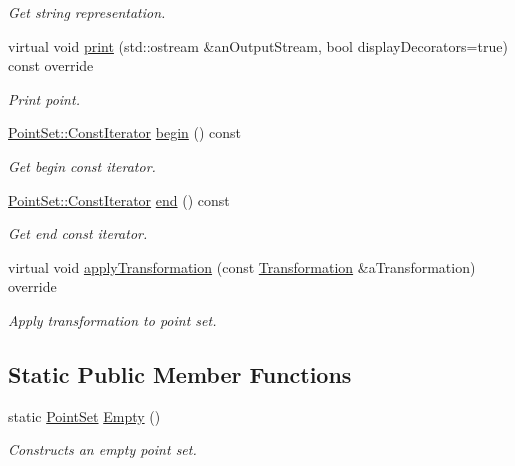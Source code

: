 \begin{DoxyCompactItemize}
\begin{DoxyCompactList}\small\item\em Get string representation. \end{DoxyCompactList}\item 
virtual void \hyperlink{classostk_1_1math_1_1geom_1_1d2_1_1objects_1_1_point_set_aef3263b63b2e9c9667365f58faee9ac7}{print} (std\+::ostream \&an\+Output\+Stream, bool display\+Decorators=true) const override
\begin{DoxyCompactList}\small\item\em Print point. \end{DoxyCompactList}\item 
\hyperlink{classostk_1_1math_1_1geom_1_1d2_1_1objects_1_1_point_set_a6a0613cc686e9247430658eee91036d0}{Point\+Set\+::\+Const\+Iterator} \hyperlink{classostk_1_1math_1_1geom_1_1d2_1_1objects_1_1_point_set_aaa290d13737a148694f97fc557e2069a}{begin} () const
\begin{DoxyCompactList}\small\item\em Get begin const iterator. \end{DoxyCompactList}\item 
\hyperlink{classostk_1_1math_1_1geom_1_1d2_1_1objects_1_1_point_set_a6a0613cc686e9247430658eee91036d0}{Point\+Set\+::\+Const\+Iterator} \hyperlink{classostk_1_1math_1_1geom_1_1d2_1_1objects_1_1_point_set_a49b262b5d0e453fd1870cce164b7288d}{end} () const
\begin{DoxyCompactList}\small\item\em Get end const iterator. \end{DoxyCompactList}\item 
virtual void \hyperlink{classostk_1_1math_1_1geom_1_1d2_1_1objects_1_1_point_set_a8c4140ca8434580a95df773d3aeed5bb}{apply\+Transformation} (const \hyperlink{classostk_1_1math_1_1geom_1_1d2_1_1_transformation}{Transformation} \&a\+Transformation) override
\begin{DoxyCompactList}\small\item\em Apply transformation to point set. \end{DoxyCompactList}\end{DoxyCompactItemize}
\subsection*{Static Public Member Functions}
\begin{DoxyCompactItemize}
\item 
static \hyperlink{classostk_1_1math_1_1geom_1_1d2_1_1objects_1_1_point_set}{Point\+Set} \hyperlink{classostk_1_1math_1_1geom_1_1d2_1_1objects_1_1_point_set_a09f5e125c7b4545a75e4eea6193bf615}{Empty} ()
\begin{DoxyCompactList}\small\item\em Constructs an empty point set. \end{DoxyCompactList}\end{DoxyCompactItemize}


